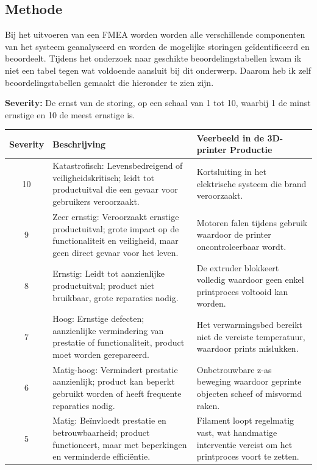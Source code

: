 \documentclass{article}
\begin{document}
\subsection{Methode}
Bij het uitvoeren van een FMEA worden worden alle verschillende componenten van het systeem geanalyseerd en worden de mogelijke storingen geïdentificeerd en beoordeelt. Tijdens het onderzoek naar geschikte beoordelingstabellen kwam ik niet een tabel tegen wat voldoende aansluit bij dit onderwerp. Daarom heb ik zelf beoordelingstabellen gemaakt die hieronder te zien zijn.

\textbf{Severity:} De ernst van de storing, op een schaal van 1 tot 10, waarbij 1 de minst ernstige en 10 de meest ernstige is.
\begin{table}[!ht]
  \centering
  \begin{tabular}{|c|p{6.5cm}|p{6.5cm}|}
    \hline
    \textbf{Severity} & \textbf{Beschrijving} & \textbf{Veerbeeld in de 3D-printer Productie}\\ 
    \hline
      10 
    & Katastrofisch: Levensbedreigend of veiligheidskritisch; leidt tot productuitval die een gevaar voor gebruikers veroorzaakt. 
    & Kortsluiting in het elektrische systeem die brand veroorzaakt.\\
    \hline
    9&
    Zeer ernstig: Veroorzaakt ernstige productuitval; grote impact op de functionaliteit en veiligheid, maar geen direct gevaar voor het leven.&
    Motoren falen tijdens gebruik waardoor de printer oncontroleerbaar wordt.\\
    \hline
    8&
    Ernstig: Leidt tot aanzienlijke productuitval; product niet bruikbaar, grote reparaties nodig.&
    De extruder blokkeert volledig waardoor geen enkel printproces voltooid kan worden.\\
    \hline
    7&
    Hoog: Ernstige defecten; aanzienlijke vermindering van prestatie of functionaliteit, product moet worden gerepareerd.&
    Het verwarmingsbed bereikt niet de vereiste temperatuur, waardoor prints mislukken.\\
    \hline
    6&
    Matig-hoog: Vermindert prestatie aanzienlijk; product kan beperkt gebruikt worden of heeft frequente reparaties nodig.&
    Onbetrouwbare z-as beweging waardoor geprinte objecten scheef of misvormd raken.\\
    \hline
    5&
    Matig: Beïnvloedt prestatie en betrouwbaarheid; product functioneert, maar met beperkingen en verminderde efficiëntie.&
    Filament loopt regelmatig vast, wat handmatige interventie vereist om het printproces voort te zetten.\\

\end{tabular}
\end{table}
\end{document}

